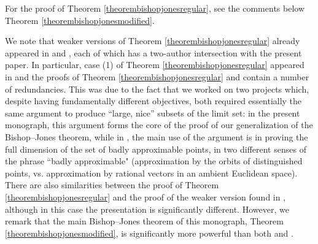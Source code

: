 For the proof of Theorem \ref{theorembishopjonesregular}, see the comments below Theorem \ref{theorembishopjonesmodified}.

\begin{remark*}
We note that weaker versions of Theorem \ref{theorembishopjonesregular} already appeared in \cite{DSU0} and \cite{FSU4}, each of which has a two-author intersection with the present paper. In particular, case (1) of Theorem \ref{theorembishopjonesregular} appeared in \cite{FSU4} and the proofs of Theorem \ref{theorembishopjonesregular} and \cite[Theorem 5.9]{FSU4} contain a number of redundancies. This was due to the fact that we worked on two projects which, despite having fundamentally different objectives, both required essentially the same argument to produce ``large, nice'' subsets of the limit set: in the present monograph, this argument forms the core of the proof of our generalization of the Bishop--Jones theorem, while in \cite{FSU4}, the main use of the argument is in proving the full dimension of the set of badly approximable points, in two different senses of the phrase ``badly approximable" (approximation by the orbits of distinguished points, vs. approximation by rational vectors in an ambient Euclidean space). There are also similarities between the proof of Theorem \ref{theorembishopjonesregular} and the proof of the weaker version found in \cite[Theorem 8.13]{DSU0}, although in this case the presentation is significantly different. However, we remark that the main Bishop--Jones theorem of this monograph, Theorem \ref{theorembishopjonesmodified}, is significantly more powerful than both \cite[Theorem 5.9]{FSU4} and \cite[Theorem 8.13]{DSU0}.
\end{remark*}

